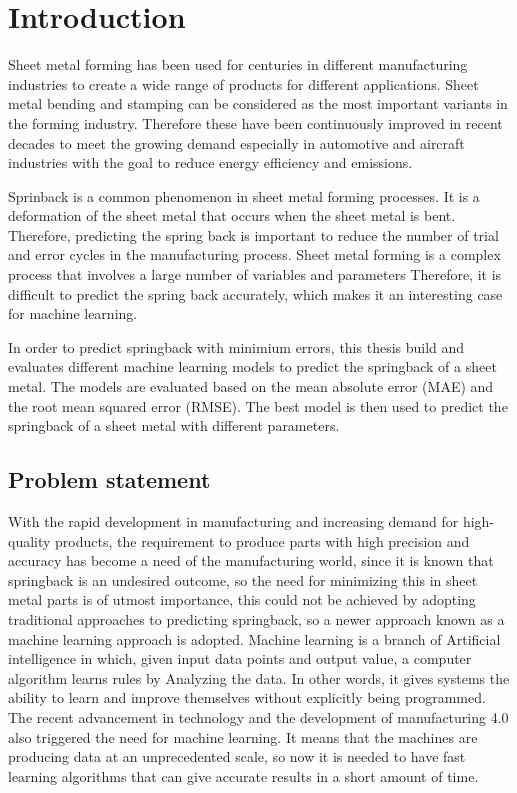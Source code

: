 \chapter{Introduction}

Sheet metal forming has been used for centuries in different manufacturing industries to create a wide range of products for different applications. 
Sheet metal bending and stamping can be considered as the most important variants in the forming industry. \cite[p. 1]{cruz_applicationmachinelearning_2021} 
Therefore these have been continuously improved in recent decades to meet the growing demand especially in  automotive and aircraft industries with the goal to reduce energy efficiency and emissions. \cite[p. 4]{zheng_reviewformingtechniques_2018}

Sprinback is a common phenomenon in sheet metal forming processes. It is a deformation of the sheet metal that occurs when the sheet metal is bent. Therefore, predicting the spring back is important to reduce the number of trial and error cycles in the manufacturing process. \cite[p. 1]{cruz_applicationmachinelearning_2021} 
Sheet metal forming is a complex process that involves a large number of variables and parameters Therefore, it is difficult to predict the spring back accurately, which makes it an interesting case for machine learning.

In order to predict springback with minimium errors, this thesis build and evaluates different machine learning models to predict the springback of a sheet metal. The models are evaluated based on the mean absolute error (MAE) and the root mean squared error (RMSE). The best model is then used to predict the springback of a sheet metal with different parameters. 

\section{Problem statement}
With the rapid development in manufacturing and increasing demand for high-quality products, the 
requirement to produce parts with high precision and accuracy has become a need of the manufacturing 
world, since it is known that springback is an undesired outcome, so the need for minimizing this in 
sheet metal parts is of utmost importance, this could not be achieved by adopting traditional approaches 
to predicting springback, so a newer approach known as a machine learning approach is adopted. 
Machine learning is a branch of Artificial intelligence in which, given input data points and output 
value, a computer algorithm learns rules by Analyzing the data. In other words, it gives systems the 
ability to learn and improve themselves without explicitly being programmed. The recent advancement 
in technology and the development of manufacturing 4.0 also triggered the need for machine learning. 
It means that the machines are producing data at an unprecedented scale, so now it is needed to have 
fast learning algorithms that can give accurate results in a short amount of time. 
\cite[]{baig_machinelearningprediction_2021}
